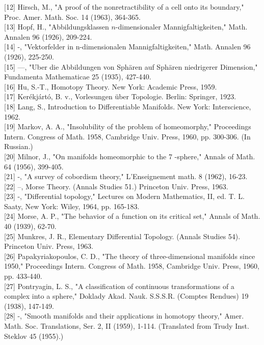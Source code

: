 \documentclass[10pt, letterpaper]{article}
\begin{document}
[12] Hirsch, M., "A proof of the nonretractibility of a cell onto its boundary," Proc. Amer. Math. Soc. 14 (1963), 364-365.\\[0pt]
[13] Hopf, H., "Abbildungsklassen $n$-dimensionaler Mannigfaltigkeiten," Math. Annalen 96 (1926), 209-224.\\[0pt]
[14] -, "Vektorfelder in n-dimensionalen Mannigfaltigkeiten," Math. Annalen 96 (1926), 225-250.\\[0pt]
[15] —, "Uber die Abbildungen von Sphären auf Sphären niedrigerer Dimension," Fundamenta Mathematicae 25 (1935), 427-440.\\[0pt]
[16] Hu, S.-T., Homotopy Theory. New York: Academic Press, 1959.\\[0pt]
[17] Kerékjártó, B. v., Vorlesungen über Topologie. Berlin: Springer, 1923.\\[0pt]
[18] Lang, S., Introduction to Differentiable Manifolds. New York: Interscience, 1962.\\[0pt]
[19] Markov, A. A., "Insolubility of the problem of homeomorphy," Proceedings Intern. Congress of Math. 1958, Cambridge Univ. Press, 1960, pp. 300-306. (In Russian.)\\[0pt]
[20] Milnor, J., "On manifolds homeomorphic to the 7 -sphere," Annals of Math. 64 (1956), 399-405.\\[0pt]
[21] -, "A survey of cobordism theory," L'Enseignement math. 8 (1962), 16-23.\\[0pt]
[22] --, Morse Theory. (Annals Studies 51.) Princeton Univ. Press, 1963.\\[0pt]
[23] -, "Differential topology," Lectures on Modern Mathematics, II, ed. T. L. Saaty, New York: Wiley, 1964, pp. 165-183.\\[0pt]
[24] Morse, A. P., "The behavior of a function on its critical set," Annals of Math. 40 (1939), 62-70.\\[0pt]
[25] Munkres, J. R., Elementary Differential Topology. (Annals Studies 54). Princeton Univ. Press, 1963.\\[0pt]
[26] Papakyriakopoulos, C. D., "The theory of three-dimensional manifolds since 1950," Proceedings Intern. Congress of Math. 1958, Cambridge Univ. Press, 1960, pp. 433-440.\\[0pt]
[27] Pontryagin, L. S., "A classification of continuous transformations of a complex into a sphere," Doklady Akad. Nauk. S.S.S.R. (Comptes Rendues) 19 (1938), 147-149.\\[0pt]
[28] -, "Smooth manifolds and their applications in homotopy theory," Amer. Math. Soc. Translations, Ser. 2, II (1959), 1-114. (Translated from Trudy Inst. Steklov 45 (1955).)\\[0pt]
\end{document}
